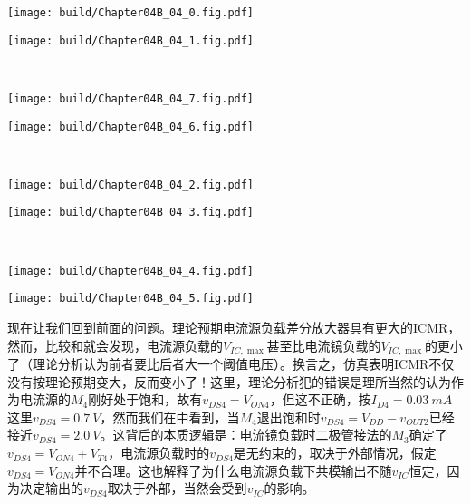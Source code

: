 \newpage
\begin{Figure}[电流源负载的差分放大器的共模特性]
    \begin{FigureSub}
        \texttt{[image: build/Chapter04B\_04\_0.fig.pdf]}
    \end{FigureSub}
    \begin{FigureSub}
        \texttt{[image: build/Chapter04B\_04\_1.fig.pdf]}
    \end{FigureSub}\\ \vspace{0.75cm}
    \begin{FigureSub}
        \texttt{[image: build/Chapter04B\_04\_7.fig.pdf]}
    \end{FigureSub}
    \begin{FigureSub}
        \texttt{[image: build/Chapter04B\_04\_6.fig.pdf]}
    \end{FigureSub}\\ \vspace{0.75cm}
    \begin{FigureSub}
        \texttt{[image: build/Chapter04B\_04\_2.fig.pdf]}
    \end{FigureSub}
    \begin{FigureSub}
        \texttt{[image: build/Chapter04B\_04\_3.fig.pdf]}
    \end{FigureSub}\\ \vspace{0.75cm}
    \begin{FigureSub}
        \texttt{[image: build/Chapter04B\_04\_4.fig.pdf]}
    \end{FigureSub}
    \begin{FigureSub}
        \texttt{[image: build/Chapter04B\_04\_5.fig.pdf]}
    \end{FigureSub}
\end{Figure}
现在让我们回到前面的问题。理论预期电流源负载差分放大器具有更大的ICMR，然而，比较和就会发现，电流源负载的$V_{IC,\max}$甚至比电流镜负载的$V_{IC,\max}$的更小了（理论分析认为前者要比后者大一个阈值电压）。换言之，仿真表明ICMR不仅没有按理论预期变大，反而变小了！这里，理论分析犯的错误是理所当然的认为作为电流源的$M_4$刚好处于饱和，故有$v_{DS4}=V_{ON4}$，但这不正确，按$I_{D4}=\SI{0.03}{mA}$这里$v_{DS4}=\SI{0.7}{V}$，然而我们在中看到，当$M_4$退出饱和时$v_{DS4}=V_{DD}-v_{OUT2}$已经接近$v_{DS4}=\SI{2.0}{V}$。这背后的本质逻辑是：电流镜负载时二极管接法的$M_3$确定了$v_{DS4}=V_{ON4}+V_{T4}$，电流源负载时的$v_{DS4}$是无约束的，取决于外部情况，假定$v_{DS4}=V_{ON4}$并不合理。这也解释了为什么电流源负载下共模输出不随$v_{IC}$恒定，因为决定输出的$v_{DS4}$取决于外部，当然会受到$v_{IC}$的影响。


